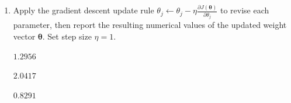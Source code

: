 \documentclass[11pt,addpoints,answers]{exam}
\newcommand{\thetav}{\boldsymbol{\theta}}
\begin{document}
\begin{enumerate}
\begin{enumerate}[label=\alph*), itemsep=10pt]
			\begin{your_solution}[title=Work,height=18cm]
				$\frac{\partial J}{\partial\theta_j}=\frac{1}{N}\sum_{i=1}^N(\sigma(\thetav^Tx^{(i)})-y^{(i)})x_j^{(i)}$\\
				where $\sigma(z)=\frac{1}{1+\exp(-z)}$\\
				For $\theta_1$: \\
				$\frac{\partial J}{\partial \theta_1} = \frac{1}{4}[(\sigma(1.5\times0+2\times0+1\times1)-0)\times0 + (\sigma(1.5\times0+2\times1+1\times0)-1)\times0 + (\sigma(1.5\times0+2\times1+1\times1)-1)\times0 + (\sigma(1.5\times1+2\times0+1\times0)-0)\times1]$\\
				$= \frac{1}{4}[0 + 0 + 0 + \sigma(1.5)] \approx 0.2044$\\
				For $\theta_2$: \\
				$\frac{\partial J}{\partial \theta_2} = \frac{1}{4}[(\sigma(1.5\times0+2\times0+1\times1)-0)\times0 + (\sigma(1.5\times0+2\times1+1\times0)-1)\times1 + (\sigma(1.5\times0+2\times1+1\times1)-1)\times1 + (\sigma(1.5\times1+2\times0+1\times0)-0)\times0]$\\
				$= \frac{1}{4}[0 + (\sigma(2)-1) + (\sigma(3)-1) + 0] \approx -0.0417$\\
				For $\theta_3$: \\
				$\frac{\partial J}{\partial \theta_3} = \frac{1}{4}[(\sigma(1.5\times0+2\times0+1\times1)-0)\times1 + (\sigma(1.5\times0+2\times1+1\times0)-1)\times0 + (\sigma(1.5\times0+2\times1+1\times1)-1)\times1 + (\sigma(1.5\times1+2\times0+1\times0)-0)\times0]$\\
				$= \frac{1}{4}[(\sigma(1)-0)\times1 + (\sigma(3)-1) + 0] \approx 0.1709$\\	
			\end{your_solution}
			
			
			\clearpage
			
			\item[(c)] Apply the gradient descent update rule $\theta_j \leftarrow \theta_j - \eta \frac{\partial J(\thetav)}{\partial \theta_j}$ to revise each parameter, then report the resulting numerical values of the updated weight vector $\thetav$. Set step size $\eta = 1$.
			
			\begin{your_solution}[title=$\theta_1$,height=1.8cm,width=5.2cm]
				$1.2956$
			\end{your_solution}
			\begin{your_solution}[title=$\theta_2$,height=1.8cm,width=5.2cm]
				$2.0417$
			\end{your_solution}
			\begin{your_solution}[title=$\theta_3$,height=1.8cm,width=5.2cm]
				$0.8291$
			\end{your_solution}
			

\end{enumerate}
\end{enumerate}
\end{document}
